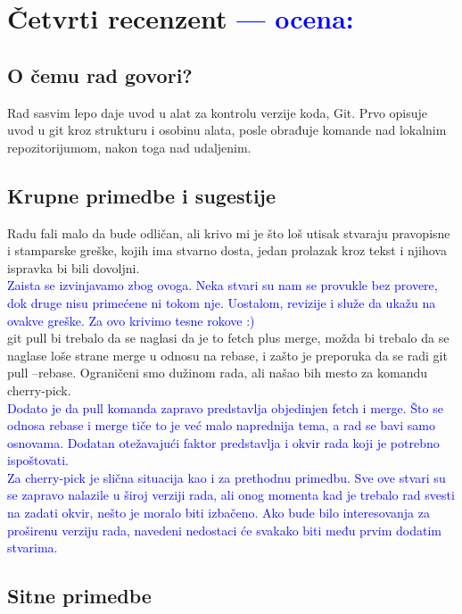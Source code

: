 \documentclass[a4paper]{report}
\newcommand{\odgovor}[1]{\textcolor{blue}{#1}}
\begin{document}
\chapter{Četvrti recenzent \odgovor{--- ocena:} }

\section{O čemu rad govori?}
Rad sasvim lepo daje uvod u alat za kontrolu verzije koda, Git. Prvo opisuje uvod u git kroz strukturu i osobinu alata, posle obrađuje komande nad lokalnim repozitorijumom, nakon toga nad udaljenim.
\section{Krupne primedbe i sugestije}
Radu fali malo da bude odličan, ali krivo mi je što loš utisak stvaraju pravopisne i stamparske greške, kojih ima stvarno dosta, jedan prolazak kroz tekst i njihova ispravka bi bili dovoljni.\\
\odgovor{Zaista se izvinjavamo zbog ovoga. Neka stvari su nam se provukle bez provere, dok druge nisu primećene ni tokom nje. Uostalom, revizije i služe da ukažu na ovakve greške. Za ovo krivimo tesne rokove :)\\ }
git pull bi trebalo da se naglasi da je to fetch plus merge, možda bi trebalo da se naglase loše strane merge u odnosu na rebase, i zašto je preporuka da se radi git pull --rebase. Ograničeni smo dužinom rada, ali našao bih mesto za komandu cherry-pick. \\
\odgovor{Dodato je da pull komanda zapravo predstavlja objedinjen fetch i merge. Što se odnosa rebase i merge tiče to je već malo naprednija tema, a rad se bavi samo osnovama. Dodatan otežavajući faktor predstavlja i okvir rada koji je potrebno ispoštovati.\\
Za cherry-pick je slična situacija kao i za prethodnu primedbu. Sve ove stvari su se zapravo nalazile u široj verziji rada, ali onog momenta kad je trebalo rad svesti na zadati okvir, nešto je moralo biti izbačeno. Ako bude bilo interesovanja za proširenu verziju rada, navedeni nedostaci će svakako biti među prvim dodatim stvarima.}
\section{Sitne primedbe}
\end{document}
